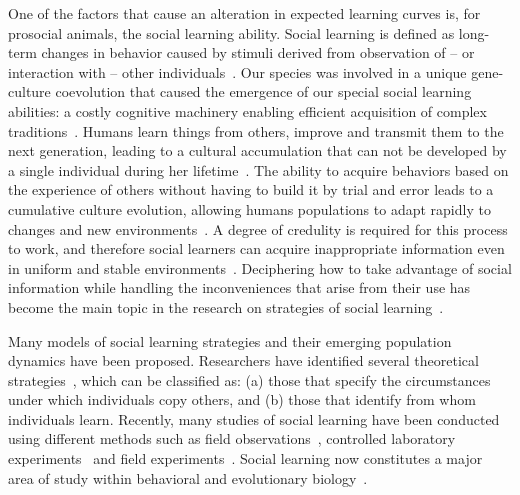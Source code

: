\documentclass[a4paper,10pt]{book}
\theoremstyle{definition}
\begin{document}
One of the factors that cause an alteration in expected learning curves is, for prosocial animals, the social learning ability.
Social learning is defined as long-term changes in behavior caused by stimuli derived from observation 
of -- or interaction with -- other individuals~\cite{hoppitt2013-socialLearningAnIntroductionBook,bandura1977-socialLearning}.
Our species was involved in a unique gene-culture coevolution that caused the emergence of our special social learning abilities: a costly cognitive machinery enabling efficient acquisition of complex traditions~\cite{richerson2010-geneCultureCoevolution}.
Humans learn things from others, improve and transmit them to the next generation, leading to a cultural accumulation that can not be developed by a single individual during her lifetime~\cite{boyd1985-evolutionaryProcess}.
The ability to acquire behaviors based on the experience of others without having to build it by trial and error leads to a cumulative culture evolution, allowing humans populations to adapt rapidly to changes and new environments~\cite{boyd2011-culturalNiche}.
A degree of credulity is required for this process to work, and therefore social learners can acquire inappropriate information even in uniform and stable environments~\cite{feldman1996-individualVsSocialLearningEvolutionaryAnalysis,giraldeau2002-potentialDisadvantagesSocialLearning}.
Deciphering how to take advantage of social information while handling the inconveniences that arise from their use has become the main topic in the research on strategies of social learning~\cite{henrich2003-evolutionOfCulturalEvolution,rendell2011-cognitiveCulture}.

Many models of social learning strategies and their emerging population dynamics have been proposed.
Researchers have identified several theoretical strategies~\cite{rendell2011-cognitiveCulture,rendell2010-socialLearningTournament}, which can be classified as: 
(a) those that specify the circumstances under which individuals copy others, and 
(b) those that identify from whom individuals learn.
Recently, many studies of social learning have been conducted using different methods such as field observations~\cite{henrich2011-adaptativeLearningBiasesFiji}, controlled laboratory experiments~\cite{baum2004-labMicroSoc,mcelreath2008-outsideLaboratorySocialLearningStrategies,efferson2008-empiricsOfFrequencyDependentCulturalTransmission,rendell2010-socialLearningTournament,mesoudi2011-experimentalPayoffBiasedSocialLearningUnderused,molleman2014-individualDifferencesSocialLearningStrategies,toelch2014-humanSocialInformationUse,caldwell2016-innovationLaboratoryCulturalEvolution,muthukrishna2016-whenAndWhoSocialLearning} and field experiments~\cite{henrich2001-eco15Soc,efferson2007-learningCulturalTransmissionBolivia,wisdom2013-socialLearningStrategiesInNetworkedGroups,glowacki2017-subsistenceStyleShapeSocialLearningStrategies}.
Social learning now constitutes a major area of study within behavioral and evolutionary biology~\cite{mesoudi2016-individualAndCulturalVariationSocialLearning}.
\end{document}
